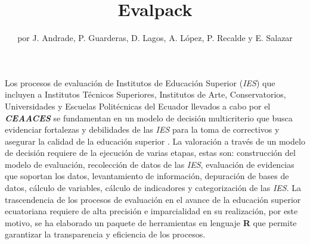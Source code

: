 \title{Evalpack}
\author{por J. Andrade, P. Guarderas, D. Lagos, A. López, P. Recalde y E. Salazar }

\maketitle



Los procesos de evaluación de Institutos de Educación Superior ({\it IES}) que incluyen a Institutos Técnicos Superiores, Institutos de Arte, Conservatorios, Universidades y Escuelas Politécnicas del Ecuador llevados a cabo por el \textit{\textbf{CEAACES}} se fundamentan en un modelo de decisión multicriterio que busca evidenciar fortalezas y debilidades de las {\it IES} para la toma de correctivos y asegurar la calidad de la educación superior \citep{1}. La valoración a través de un modelo de decisión requiere de la ejecución de varias etapas, estas son: construcción del modelo de evaluación, recolección de datos de las {\it IES}, evaluación de evidencias que soportan los datos, levantamiento de información, depuración de bases de datos, cálculo de variables, cálculo de indicadores y categorización de las {\it IES}. La trascendencia de los procesos de evaluación en el avance de la educación superior ecuatoriana requiere de alta precisión e imparcialidad en su realización, por este motivo, se ha elaborado un paquete de herramientas en lenguaje {\bf R }que permite garantizar la transparencia y eficiencia de los procesos.    

